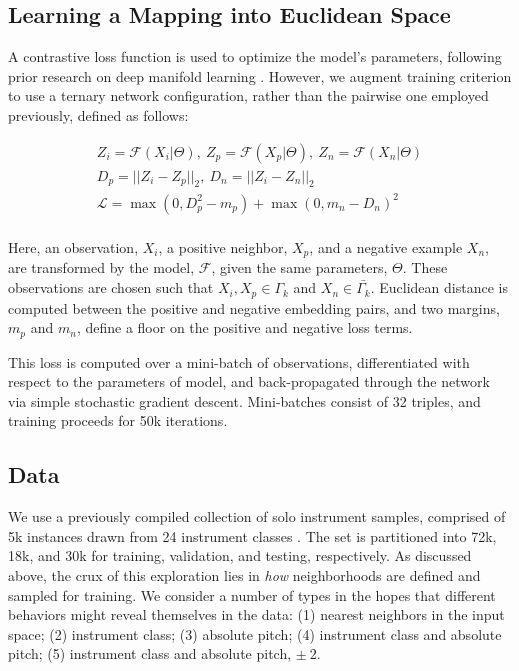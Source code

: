 \documentclass{article}
\begin{document}
\subsection{Learning a Mapping into Euclidean Space}

A contrastive loss function is used to optimize the model's parameters, following prior research on deep manifold learning \cite{hadsell2006drlim, humphrey2011nlse, humphrey2015dl4mir}.
However, we augment training criterion to use a ternary network configuration, rather than the pairwise one employed previously, defined as follows:

\begin{align*}
Z_i = \mathcal{F}(X_i | \Theta),~Z_p = \mathcal{F}(X_p | \Theta),~Z_n = \mathcal{F}(X_n | \Theta)\\
D_p = || Z_i - Z_p ||_2,~D_n = || Z_i - Z_n ||_2\\
\mathcal{L} = \max(0, D_p^2 - m_{p}) + \max(0, m_{n} - D_n)^2 \\
\end{align*}

Here, an observation, $X_i$, a positive neighbor, $X_p$, and a negative example $X_n$, are transformed by the model, $\mathcal{F}$, given the same parameters, $\Theta$.
These observations are chosen such that $X_i, X_p \in \Gamma_k$ and $X_n \in \bar{\Gamma_k}$.
Euclidean distance is computed between the positive and negative embedding pairs, and two margins, $m_p$ and $m_n$, define a floor on the positive and negative loss terms.

This loss is computed over a mini-batch of observations, differentiated with respect to the parameters of model, and back-propagated through the network via simple stochastic gradient descent.
Mini-batches consist of 32 triples, and training proceeds for 50k iterations.

\subsection{Data}

We use a previously compiled collection of solo instrument samples, comprised of 5k instances drawn from 24 instrument classes \cite{humphrey2015dl4mir}.
The set is partitioned into 72k, 18k, and 30k for training, validation, and testing, respectively.
As discussed above, the crux of this exploration lies in \emph{how} neighborhoods are defined and sampled for training.
We consider a number of types in the hopes that different behaviors might reveal themselves in the data:
(1) nearest neighbors in the input space;
(2) instrument class;
(3) absolute pitch;
(4) instrument class and absolute pitch;
(5) instrument class and absolute pitch, $\pm~2$.
\end{document}

